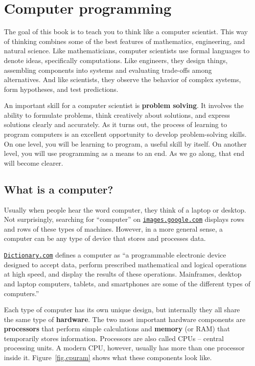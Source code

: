 \chapter{Computer programming}
\label{theway}

The goal of this book is to teach you to think like a computer scientist.
This way of thinking combines some of the best features of mathematics, engineering, and natural science.
Like mathematicians, computer scientists use formal languages to denote ideas, specifically computations.
Like engineers, they design things, assembling components into systems and evaluating trade-offs among alternatives.
And like scientists, they observe the behavior of complex systems, form hypotheses, and test predictions.


An important skill for a computer scientist is {\bf problem solving}.
It involves the ability to formulate problems, think creatively about solutions, and express solutions clearly and accurately.
As it turns out, the process of learning to program computers is an excellent opportunity to develop problem-solving skills.
On one level, you will be learning to program, a useful skill by itself.
On another level, you will use programming as a means to an end.
As we go along, that end will become clearer.


\section{What is a computer?}

Usually when people hear the word computer, they think of a laptop or desktop.
Not surprisingly, searching for ``computer'' on \href{https://images.google.com/}{\tt images.google.com}
displays rows and rows of these types of machines.
However, in a more general sense, a computer can be any type of device that stores and processes data.

\href{http://www.dictionary.com/browse/computer}{\tt Dictionary.com} defines a computer as ``a programmable electronic device designed to accept data, perform prescribed mathematical and logical operations at high speed, and display the results of these operations.
Mainframes, desktop and laptop computers, tablets, and smartphones are some of the different types of computers.''


Each type of computer has its own unique design, but internally they all share the same type of {\bf hardware}.
The two most important hardware components are {\bf processors} that perform simple calculations and {\bf memory} (or RAM) that temporarily stores information. Processors are also called CPUs -- central processing units. A modern CPU, however, usually has more than one processor inside it.
Figure~\ref{fig.cpuram} shows what these components look like.

